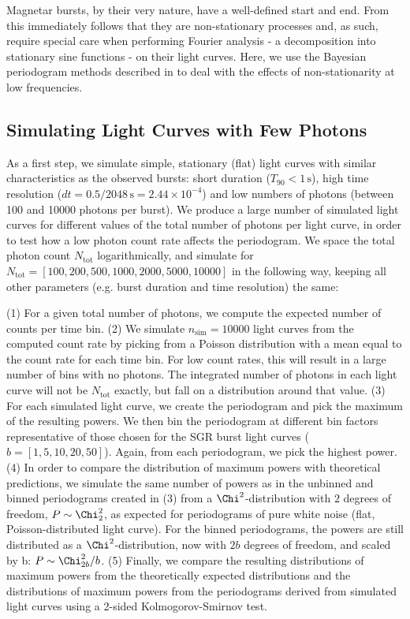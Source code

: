 \documentclass[numberedappendix]{emulateapj}
\begin{document}
Magnetar bursts, by their very nature, have a well-defined start and end. From this immediately follows that they are non-stationary processes and, as such, require special care when performing Fourier analysis - a decomposition into stationary sine functions - on their light curves. 
Here, we use the Bayesian periodogram methods described in \citet{Huppenkothen13} to deal with the effects of non-stationarity at low frequencies. 


\subsection{Simulating Light Curves with Few Photons}

As a first step, we simulate simple, stationary (flat) light curves with similar characteristics as the observed bursts: short duration ($T_{90} < 1 \, \mathrm{s}$), high time resolution ($dt = 0.5/2048 \, \mathrm{s} = 2.44\times 10^{-4}$) and low numbers of photons (between 100 and 10000 photons per burst). 
We produce a large number of simulated light curves for different values of the total number of photons per light curve, in order to test how a low photon count rate affects the periodogram. We space the total photon count $N_{\mathrm{tot}}$ logarithmically, and simulate for $N_{\mathrm{tot}} = [100, 200, 500, 1000, 2000, 5000, 10000]$ in the following way, keeping all other parameters (e.g. burst duration and time resolution) the same:

(1) For a given total number of photons, we compute the expected number of counts per time bin. 
(2) We simulate $n_{\mathrm{sim}} = 10000$ light curves from the computed count rate by picking from a Poisson distribution with a mean equal to the count rate for each time bin. For low count rates, this will result in a large number of bins with no photons. The integrated number of photons in each light curve will not be $N_{\mathrm{tot}}$ exactly, but fall on a distribution around that value.
(3) For each simulated light curve, we create the periodogram and pick the maximum of the resulting powers. We then bin the periodogram at different bin factors representative of those chosen for the SGR burst light curves ($b = [1, 5, 10, 20, 50]$). Again, from each periodogram, we pick the highest power.
(4) In order to compare the distribution of maximum powers with theoretical predictions, we simulate the same number of powers as in the unbinned and binned periodograms created in (3) from a $\Chi^2$-distribution with $2$ degrees of freedom, $P \sim \Chi^2_2$, as expected for periodograms of pure white noise (flat, Poisson-distributed light curve). For the binned periodograms, the powers are still distributed as a $\Chi^2$-distribution, now with $2b$ degrees of freedom, and scaled by b: $P \sim \Chi^2_{2b}/b$.
(5) Finally, we compare the resulting distributions of maximum powers from the theoretically expected distributions and the distributions of maximum powers from the periodograms derived from simulated light curves using a 2-sided Kolmogorov-Smirnov test. 
\end{document}
